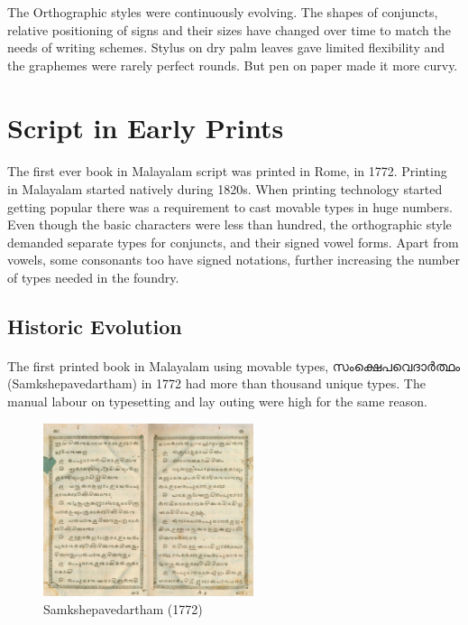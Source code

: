 \documentclass[10pt]{article}
\begin{document}
 The Orthographic styles were continuously evolving. The shapes of conjuncts, relative positioning of signs and their sizes have changed over time to match the needs of writing schemes. Stylus on dry palm leaves gave limited flexibility and the graphemes were rarely perfect rounds. But pen on paper made it more curvy. 

\section{Script in Early Prints }

\paragraph{}
The first ever book in Malayalam script was printed in Rome, in 1772. Printing in Malayalam started natively during 1820s\cite{babucherian}. When printing technology started getting popular there was a requirement to cast movable types in huge numbers. Even though the basic characters were less than hundred, the orthographic style demanded separate types for conjuncts, and their signed vowel forms. Apart from vowels, some consonants too have signed notations, further increasing the number of types needed in the foundry. 

\subsection{Historic Evolution}

\paragraph{}
The first printed book in Malayalam using movable types, {\manjari സംക്ഷെപവെദാർത്ഥം} (Samkshepavedartham) in 1772 had more than thousand unique types\cite{babucherian}. The manual labour on typesetting and lay outing were high for the same reason. 

\begin{figure}
 \centering
  \includegraphics[width=0.55\textwidth]{images/samkshepavedartham1772.png}
   \caption{Samkshepavedartham (1772)}
	\label{Samkshepam}
\end{figure}
\end{document}
